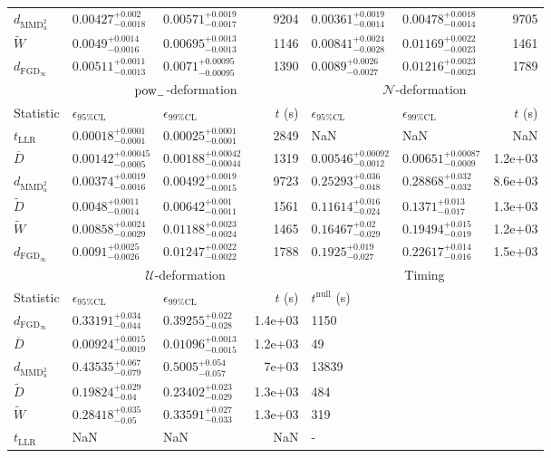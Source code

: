 \begin{tabular}{l|llr|llr}
	$d_{\mathrm{MMD}^{2}_{u}}$ & $0.00427_{-0.0018}^{+0.002}$ & $0.00571_{-0.0017}^{+0.0019}$ & 9204 & $0.00361_{-0.0014}^{+0.0019}$ & $0.00478_{-0.0014}^{+0.0018}$ & 9705 \\
	$\widetilde{W}$ & $0.0049_{-0.0016}^{+0.0014}$ & $0.00695_{-0.0013}^{+0.0013}$ & 1146 & $0.00841_{-0.0028}^{+0.0024}$ & $0.01169_{-0.0023}^{+0.0022}$ & 1461 \\
	$d_{\mathrm{FGD}_{\infty}}$ & $0.00511_{-0.0013}^{+0.0011}$ & $0.0071_{-0.00095}^{+0.00095}$ & 1390 & $0.0089_{-0.0027}^{+0.0026}$ & $0.01216_{-0.0023}^{+0.0023}$ & 1789 \\
	\toprule
	\multicolumn{1}{c}{} & \multicolumn{3}{c}{$\rm{pow}_{-}$-deformation} & \multicolumn{3}{c}{$\mathcal{N}$-deformation} \\
	Statistic & $\epsilon_{95\%\mathrm{CL}}$ & $\epsilon_{99\%\mathrm{CL}}$ & $t$ (s) & $\epsilon_{95\%\mathrm{CL}}$ & $\epsilon_{99\%\mathrm{CL}}$ & $t$ (s) \\
	\midrule
	$t_{\mathrm{LLR}}$ & $0.00018_{-0.0001}^{+0.0001}$ & $0.00025_{-0.0001}^{+0.0001}$ & 2849 & NaN & NaN & NaN \\
	$\overline{D}$ & $0.00142_{-0.0005}^{+0.00045}$ & $0.00188_{-0.00044}^{+0.00042}$ & 1319 & $0.00546_{-0.0012}^{+0.00092}$ & $0.00651_{-0.0009}^{+0.00087}$ & 1.2e+03 \\
	$d_{\mathrm{MMD}^{2}_{u}}$ & $0.00374_{-0.0016}^{+0.0019}$ & $0.00492_{-0.0015}^{+0.0019}$ & 9723 & $0.25293_{-0.048}^{+0.036}$ & $0.28868_{-0.032}^{+0.032}$ & 8.6e+03 \\
	$\widetilde{D}$ & $0.0048_{-0.0014}^{+0.0011}$ & $0.00642_{-0.0011}^{+0.001}$ & 1561 & $0.11614_{-0.024}^{+0.016}$ & $0.1371_{-0.017}^{+0.013}$ & 1.3e+03 \\
	$\widetilde{W}$ & $0.00858_{-0.0029}^{+0.0024}$ & $0.01188_{-0.0024}^{+0.0023}$ & 1465 & $0.16467_{-0.029}^{+0.02}$ & $0.19494_{-0.019}^{+0.015}$ & 1.2e+03 \\
	$d_{\mathrm{FGD}_{\infty}}$ & $0.0091_{-0.0026}^{+0.0025}$ & $0.01247_{-0.0022}^{+0.0022}$ & 1788 & $0.1925_{-0.027}^{+0.019}$ & $0.22617_{-0.016}^{+0.014}$ & 1.5e+03 \\
	\toprule
	\multicolumn{1}{c}{} & \multicolumn{3}{c}{$\mathcal{U}$-deformation} & \multicolumn{3}{c}{Timing} \\
	Statistic & $\epsilon_{95\%\mathrm{CL}}$ & $\epsilon_{99\%\mathrm{CL}}$ & $t$ (s) & $t^{\mathrm{null}}$ (s) \\
	\midrule
	$d_{\mathrm{FGD}_{\infty}}$ & $0.33191_{-0.044}^{+0.034}$ & $0.39255_{-0.028}^{+0.022}$ & 1.4e+03 & 1150 \\
	$\overline{D}$ & $0.00924_{-0.0019}^{+0.0015}$ & $0.01096_{-0.0015}^{+0.0013}$ & 1.2e+03 & 49 \\
	$d_{\mathrm{MMD}^{2}_{u}}$ & $0.43535_{-0.079}^{+0.067}$ & $0.5005_{-0.057}^{+0.054}$ & 7e+03 & 13839 \\
	$\widetilde{D}$ & $0.19824_{-0.04}^{+0.029}$ & $0.23402_{-0.029}^{+0.023}$ & 1.3e+03 & 484 \\
	$\widetilde{W}$ & $0.28418_{-0.05}^{+0.035}$ & $0.33591_{-0.033}^{+0.027}$ & 1.3e+03 & 319 \\
	$t_{\mathrm{LLR}}$ & NaN & NaN & NaN & - \\
	\bottomrule
\end{tabular}